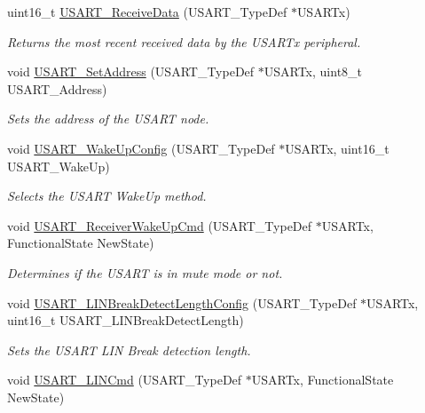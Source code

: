 \begin{DoxyCompactItemize}
uint16\-\_\-t \hyperlink{group___u_s_a_r_t_gac67a91845b0b1d54d31bdfb1c5e9867c}{U\-S\-A\-R\-T\-\_\-\-Receive\-Data} (U\-S\-A\-R\-T\-\_\-\-Type\-Def $\ast$U\-S\-A\-R\-Tx)
\begin{DoxyCompactList}\small\item\em Returns the most recent received data by the U\-S\-A\-R\-Tx peripheral. \end{DoxyCompactList}\item 
void \hyperlink{group___u_s_a_r_t_ga65ec9928817f3f031dd9a4dfc95d6666}{U\-S\-A\-R\-T\-\_\-\-Set\-Address} (U\-S\-A\-R\-T\-\_\-\-Type\-Def $\ast$U\-S\-A\-R\-Tx, uint8\-\_\-t U\-S\-A\-R\-T\-\_\-\-Address)
\begin{DoxyCompactList}\small\item\em Sets the address of the U\-S\-A\-R\-T node. \end{DoxyCompactList}\item 
void \hyperlink{group___u_s_a_r_t_ga4965417c2412c36e462fcad50a8d5393}{U\-S\-A\-R\-T\-\_\-\-Wake\-Up\-Config} (U\-S\-A\-R\-T\-\_\-\-Type\-Def $\ast$U\-S\-A\-R\-Tx, uint16\-\_\-t U\-S\-A\-R\-T\-\_\-\-Wake\-Up)
\begin{DoxyCompactList}\small\item\em Selects the U\-S\-A\-R\-T Wake\-Up method. \end{DoxyCompactList}\item 
void \hyperlink{group___u_s_a_r_t_gac27b78ce445a16fe33851d2f87781c02}{U\-S\-A\-R\-T\-\_\-\-Receiver\-Wake\-Up\-Cmd} (U\-S\-A\-R\-T\-\_\-\-Type\-Def $\ast$U\-S\-A\-R\-Tx, Functional\-State New\-State)
\begin{DoxyCompactList}\small\item\em Determines if the U\-S\-A\-R\-T is in mute mode or not. \end{DoxyCompactList}\item 
void \hyperlink{group___u_s_a_r_t_ga7bc2d291831cbc5e53e73337308029b5}{U\-S\-A\-R\-T\-\_\-\-L\-I\-N\-Break\-Detect\-Length\-Config} (U\-S\-A\-R\-T\-\_\-\-Type\-Def $\ast$U\-S\-A\-R\-Tx, uint16\-\_\-t U\-S\-A\-R\-T\-\_\-\-L\-I\-N\-Break\-Detect\-Length)
\begin{DoxyCompactList}\small\item\em Sets the U\-S\-A\-R\-T L\-I\-N Break detection length. \end{DoxyCompactList}\item 
void \hyperlink{group___u_s_a_r_t_ga9fdd6296f4ca4acdfcbd58bf56bd4185}{U\-S\-A\-R\-T\-\_\-\-L\-I\-N\-Cmd} (U\-S\-A\-R\-T\-\_\-\-Type\-Def $\ast$U\-S\-A\-R\-Tx, Functional\-State New\-State)

\end{DoxyCompactItemize}
